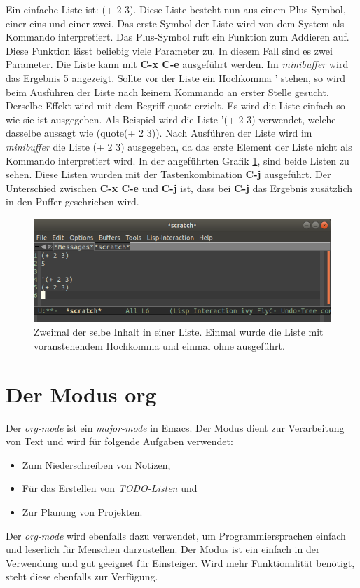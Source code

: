Ein einfache Liste ist: {\glqq}(+ 2 3){\grqq}. Diese Liste besteht nun
aus einem Plus-Symbol, einer eins und einer zwei. Das erste Symbol der
Liste wird von dem System als Kommando interpretiert. Das Plus-Symbol
ruft ein Funktion zum Addieren auf. Diese Funktion lässt beliebig
viele Parameter zu. In diesem Fall sind es zwei Parameter. Die Liste
kann mit \textbf{C-x C-e} ausgeführt werden. Im \textit{minibuffer}
wird das Ergebnis {\glqq}5{\grqq} angezeigt. Sollte vor der Liste ein
Hochkomma {\glqq}'{\grqq} stehen, so wird beim Ausführen der Liste
nach keinem Kommando an erster Stelle gesucht. Derselbe Effekt wird
mit dem Begriff {\glqq}quote{\grqq} erzielt. Es wird die Liste einfach
so wie sie ist ausgegeben. Als Beispiel wird die Liste '(+ 2 3)
verwendet, welche dasselbe aussagt wie (quote(+ 2 3)). Nach Ausführen
der Liste wird im \textit{minibuffer} die Liste (+ 2 3) ausgegeben, da
das erste Element der Liste nicht als Kommando interpretiert wird. In
der angeführten Grafik \ref{fig:elisp}, sind beide Listen zu
sehen. Diese Listen wurden mit der Tastenkombination \textbf{C-j}
ausgeführt. Der Unterschied zwischen \textbf{C-x C-e} und \textbf{C-j}
ist, dass bei \textbf{C-j} das Ergebnis zusätzlich in den Puffer
geschrieben wird.\\

\begin{figure}[h]
  \centering
  \includegraphics[width=.95\textwidth]{./images/Grundlagen/Elisp.png}
  \caption{\label{fig:elisp}Zweimal der selbe Inhalt in einer
    Liste. Einmal wurde die Liste mit voranstehendem Hochkomma und
    einmal ohne ausgeführt.}
\end{figure}

\section{Der Modus org}
\label{sec:orgmode}
Der \textit{org-mode} ist ein \textit{major-mode} in Emacs. Der Modus
dient zur Verarbeitung von Text und wird für folgende Aufgaben
verwendet:
\begin{itemize}
\item Zum Niederschreiben von Notizen,
\item Für das Erstellen von \textit{TODO-Listen} und
\item Zur Planung von Projekten.
\end{itemize}
Der \textit{org-mode} wird ebenfalls dazu verwendet, um
Programmiersprachen einfach und leserlich für Menschen
darzustellen. Der Modus ist ein einfach in der Verwendung und gut
geeignet für Einsteiger. Wird mehr Funktionalität benötigt, steht
diese ebenfalls zur Verfügung. \cite{OrgMode}

